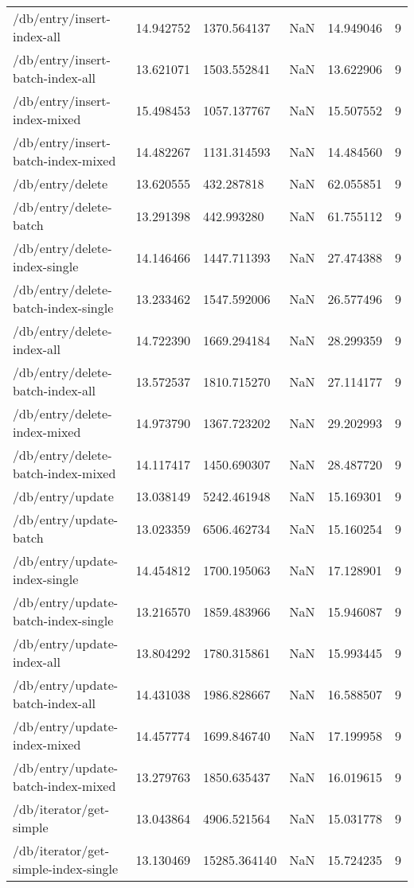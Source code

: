 \begin{tabularx}{\linewidth}{XXXXXX}
/db/entry/insert-index-all & 14.942752 & 1370.564137 & NaN & 14.949046 & 9 \\
/db/entry/insert-batch-index-all & 13.621071 & 1503.552841 & NaN & 13.622906 & 9 \\
/db/entry/insert-index-mixed & 15.498453 & 1057.137767 & NaN & 15.507552 & 9 \\
/db/entry/insert-batch-index-mixed & 14.482267 & 1131.314593 & NaN & 14.484560 & 9 \\
/db/entry/delete & 13.620555 & 432.287818 & NaN & 62.055851 & 9 \\
/db/entry/delete-batch & 13.291398 & 442.993280 & NaN & 61.755112 & 9 \\
/db/entry/delete-index-single & 14.146466 & 1447.711393 & NaN & 27.474388 & 9 \\
/db/entry/delete-batch-index-single & 13.233462 & 1547.592006 & NaN & 26.577496 & 9 \\
/db/entry/delete-index-all & 14.722390 & 1669.294184 & NaN & 28.299359 & 9 \\
/db/entry/delete-batch-index-all & 13.572537 & 1810.715270 & NaN & 27.114177 & 9 \\
/db/entry/delete-index-mixed & 14.973790 & 1367.723202 & NaN & 29.202993 & 9 \\
/db/entry/delete-batch-index-mixed & 14.117417 & 1450.690307 & NaN & 28.487720 & 9 \\
/db/entry/update & 13.038149 & 5242.461948 & NaN & 15.169301 & 9 \\
/db/entry/update-batch & 13.023359 & 6506.462734 & NaN & 15.160254 & 9 \\
/db/entry/update-index-single & 14.454812 & 1700.195063 & NaN & 17.128901 & 9 \\
/db/entry/update-batch-index-single & 13.216570 & 1859.483966 & NaN & 15.946087 & 9 \\
/db/entry/update-index-all & 13.804292 & 1780.315861 & NaN & 15.993445 & 9 \\
/db/entry/update-batch-index-all & 14.431038 & 1986.828667 & NaN & 16.588507 & 9 \\
/db/entry/update-index-mixed & 14.457774 & 1699.846740 & NaN & 17.199958 & 9 \\
/db/entry/update-batch-index-mixed & 13.279763 & 1850.635437 & NaN & 16.019615 & 9 \\
/db/iterator/get-simple & 13.043864 & 4906.521564 & NaN & 15.031778 & 9 \\
/db/iterator/get-simple-index-single & 13.130469 & 15285.364140 & NaN & 15.724235 & 9 \\

\end{tabularx}
